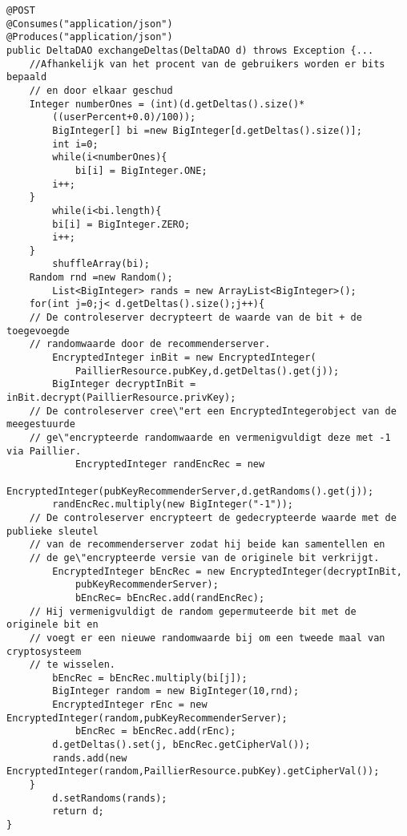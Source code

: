 \begin{verbatim}
@POST
@Consumes("application/json")
@Produces("application/json")
public DeltaDAO exchangeDeltas(DeltaDAO d) throws Exception {...
    //Afhankelijk van het procent van de gebruikers worden er bits bepaald 
    // en door elkaar geschud
	Integer numberOnes = (int)(d.getDeltas().size()*
		((userPercent+0.0)/100));
    	BigInteger[] bi =new BigInteger[d.getDeltas().size()];
    	int i=0;
    	while(i<numberOnes){
    		bi[i] = BigInteger.ONE;
        i++;
   	}
    	while(i<bi.length){
        bi[i] = BigInteger.ZERO;
        i++;
    }
    	shuffleArray(bi);
   	Random rnd =new Random();
    	List<BigInteger> rands = new ArrayList<BigInteger>();
    for(int j=0;j< d.getDeltas().size();j++){
    // De controleserver decrypteert de waarde van de bit + de toegevoegde 
    // randomwaarde door de recommenderserver.
       	EncryptedInteger inBit = new EncryptedInteger(
       		PaillierResource.pubKey,d.getDeltas().get(j));
       	BigInteger decryptInBit =  inBit.decrypt(PaillierResource.privKey);
    // De controleserver cree\"ert een EncryptedIntegerobject van de meegestuurde 
    // ge\"encrypteerde randomwaarde en vermenigvuldigt deze met -1 via Paillier.
    		EncryptedInteger randEncRec = new 
        		EncryptedInteger(pubKeyRecommenderServer,d.getRandoms().get(j));
      	randEncRec.multiply(new BigInteger("-1"));
    // De controleserver encrypteert de gedecrypteerde waarde met de publieke sleutel
    // van de recommenderserver zodat hij beide kan samentellen en 
    // de ge\"encrypteerde versie van de originele bit verkrijgt.
      	EncryptedInteger bEncRec = new EncryptedInteger(decryptInBit,
      		pubKeyRecommenderServer);
        	bEncRec= bEncRec.add(randEncRec);
    // Hij vermenigvuldigt de random gepermuteerde bit met de originele bit en 
    // voegt er een nieuwe randomwaarde bij om een tweede maal van cryptosysteem 
    // te wisselen.
       	bEncRec = bEncRec.multiply(bi[j]);
        BigInteger random = new BigInteger(10,rnd);
       	EncryptedInteger rEnc = new EncryptedInteger(random,pubKeyRecommenderServer);
        	bEncRec = bEncRec.add(rEnc);
       	d.getDeltas().set(j, bEncRec.getCipherVal());
       	rands.add(new EncryptedInteger(random,PaillierResource.pubKey).getCipherVal());        
   	}
    	d.setRandoms(rands);
    	return d;        
}
\end{verbatim}
